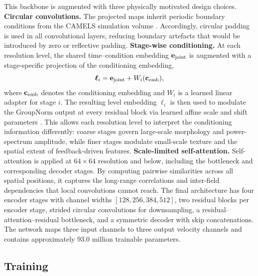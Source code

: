 \documentclass[usenatbib]{mnras}
\begin{document}
This backbone is augmented with three physically motivated design
choices. \textbf{Circular convolutions.}
The projected maps inherit periodic boundary conditions from the
CAMELS simulation volume \citep{Villaescusa2022}. Accordingly,
circular padding is used in all convolutional layers, reducing boundary
artefacts that would be introduced by zero or reflective padding.
\textbf{Stage-wise conditioning.}
At each resolution level, the shared time--condition embedding
$\mathbf{e}_{\rm joint}$ is augmented with a
stage-specific projection of the conditioning embedding,
\begin{equation}
  \boldsymbol{\ell}_i
  =
  \mathbf{e}_{\rm joint} + W_i(\mathbf{c}_{\rm emb}),
  \label{eq:stage_embedding}
\end{equation}
where $\mathbf{c}_{\rm emb}$ denotes the conditioning embedding and
$W_i$ is a learned linear adapter for stage $i$. The
resulting level embedding $\boldsymbol{\ell}_i$ is then used to
modulate the GroupNorm \citep{Wu2018} output at every residual block
via learned affine scale and shift parameters \citep[FiLM;][]{Perez2018}.
This allows each resolution level to interpret the conditioning
information differently: coarse stages govern large-scale morphology
and power-spectrum amplitude, while finer stages modulate small-scale
texture and the spatial extent of feedback-driven features.
\textbf{Scale-limited self-attention.}
Self-attention \citep{Vaswani2017} is applied at $64\times64$
resolution and below, including the bottleneck and corresponding
decoder stages. By computing pairwise similarities across all spatial
positions, it captures the long-range correlations and
inter-field dependencies that local convolutions cannot reach.
The final architecture has four encoder stages with channel widths
$[128, 256, 384, 512]$, two residual blocks per encoder stage,
strided circular convolutions for downsampling, a
residual--attention--residual bottleneck, and a symmetric decoder
with skip concatenations. The network maps three input channels to
three output velocity channels and contains approximately $93.0$
million trainable parameters.

\subsection{Training}
\label{sec:training}
\end{document}
